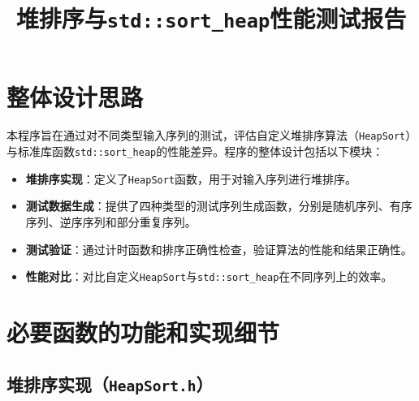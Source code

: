\documentclass{ctexart}
\title{堆排序与\texttt{std::sort\_heap}性能测试报告}
\author{}
\date{}
\begin{document}
\maketitle

\section{整体设计思路}

本程序旨在通过对不同类型输入序列的测试，评估自定义堆排序算法（\texttt{HeapSort}）与标准库函数\texttt{std::sort\_heap}的性能差异。程序的整体设计包括以下模块：

\begin{itemize}
    \item \textbf{堆排序实现}：定义了\texttt{HeapSort}函数，用于对输入序列进行堆排序。
    \item \textbf{测试数据生成}：提供了四种类型的测试序列生成函数，分别是随机序列、有序序列、逆序序列和部分重复序列。
    \item \textbf{测试验证}：通过计时函数和排序正确性检查，验证算法的性能和结果正确性。
    \item \textbf{性能对比}：对比自定义\texttt{HeapSort}与\texttt{std::sort\_heap}在不同序列上的效率。
\end{itemize}

\section{必要函数的功能和实现细节}

\subsection{堆排序实现（\texttt{HeapSort.h}）}
\end{document}
